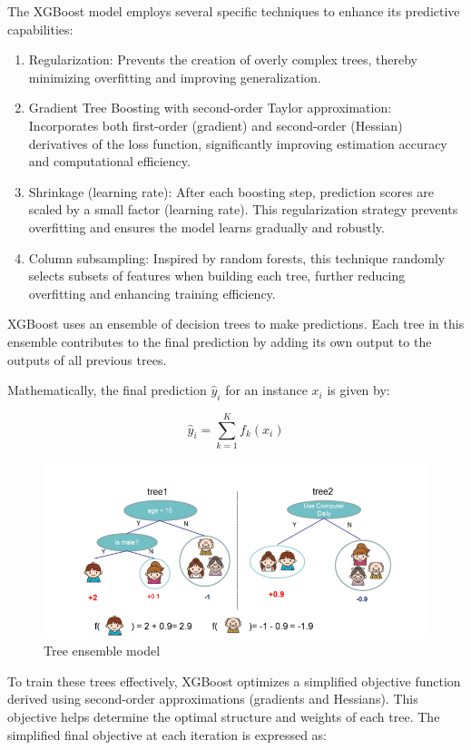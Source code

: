 \documentclass{SGGW-thesis-EN}
\begin{document}
The XGBoost model employs several specific techniques to enhance its predictive capabilities:
\begin{enumerate}
  \item Regularization: Prevents the creation of overly complex trees, thereby minimizing overfitting and improving generalization.
  \item Gradient Tree Boosting with second-order Taylor approximation: Incorporates both first-order (gradient) and second-order (Hessian) derivatives of the loss function, significantly improving estimation accuracy and computational efficiency.
  \item Shrinkage (learning rate): After each boosting step, prediction scores are scaled by a small factor (learning rate). This regularization strategy prevents overfitting and ensures the model learns gradually and robustly.
  \item Column subsampling: Inspired by random forests, this technique randomly selects subsets of features when building each tree, further reducing overfitting and enhancing training efficiency. 
\end{enumerate}
XGBoost uses an ensemble of decision trees to make predictions. 
Each tree in this ensemble contributes to the final prediction by adding its own output to the outputs of all previous trees.

Mathematically, the final prediction $\hat{y}_i$ for an instance $x_i$ is given by:

\begin{figure}[h!]
  \centering
  \begin{minipage}[c]{0.4\textwidth}
      \centering
      \[
      \hat{y}_i = \sum_{k=1}^{K} f_k(x_i)
      \]
  \end{minipage}\hfill
  \begin{minipage}[c]{0.55\textwidth}
      \centering
      \includegraphics[width=\linewidth]{images/tree_ensemble_model.png}
      \caption{Tree ensemble model \cite{Chen_2016}}
      \label{fig:tree_ensemble_model}
  \end{minipage}
\end{figure}
To train these trees effectively, XGBoost optimizes a simplified objective function derived using second-order approximations (gradients and Hessians). 
This objective helps determine the optimal structure and weights of each tree. The simplified final objective at each iteration is expressed as:
\end{document}
